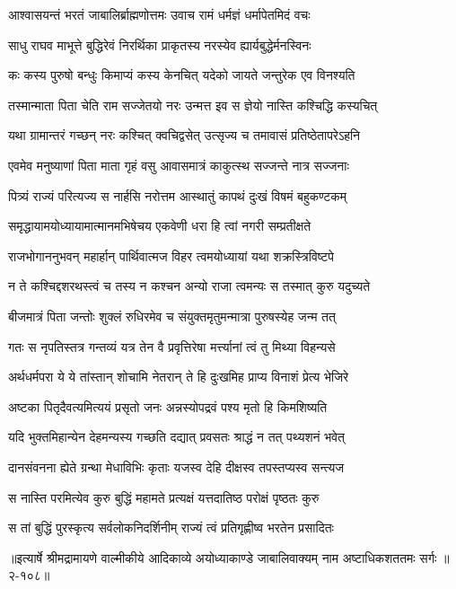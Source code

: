 
\twolineshloka
{आश्वासयन्तं भरतं जाबालिर्ब्राह्मणोत्तमः}
{उवाच रामं धर्मज्ञं धर्मापेतमिदं वचः} %

\twolineshloka
{साधु राघव माभूत्ते बुद्धिरेवं निरर्थिका}
{प्राकृतस्य नरस्येव ह्यार्यबुद्धेर्मनस्विनः} %

\twolineshloka
{कः कस्य पुरुषो बन्धुः किमाप्यं कस्य केनचित्}
{यदेको जायते जन्तुरेक एव विनश्यति} %

\twolineshloka
{तस्मान्माता पिता चेति राम सज्जेतयो नरः}
{उन्मत्त इव स ज्ञेयो नास्ति कश्चिद्धि कस्यचित्} %

\twolineshloka
{यथा ग्रामान्तरं गच्छन् नरः कश्चित् क्वचिद्वसेत्}
{उत्सृज्य च तमावासं प्रतिष्ठेतापरेऽहनि} %

\twolineshloka
{एवमेव मनुष्याणां पिता माता गृहं वसु}
{आवासमात्रं काकुत्स्थ सज्जन्ते नात्र सज्जनाः} %

\twolineshloka
{पित्र्यं राज्यं परित्यज्य स नार्हसि नरोत्तम}
{आस्थातुं कापथं दुःखं विषमं बहुकण्टकम्} %

\twolineshloka
{समृद्धायामयोध्यायामात्मानमभिषेचय}
{एकवेणी धरा हि त्वां नगरी सम्प्रतीक्षते} %

\twolineshloka
{राजभोगाननुभवन् महार्हान् पार्थिवात्मज}
{विहर त्वमयोध्यायां यथा शक्रस्त्रिविष्टपे} %

\twolineshloka
{न ते कश्चिद्दशरथस्त्वं च तस्य न कश्चन}
{अन्यो राजा त्वमन्यः स तस्मात् कुरु यदुच्यते} %

\twolineshloka
{बीजमात्रं पिता जन्तोः शुक्लं रुधिरमेव च}
{संयुक्तमृतुमन्मात्रा पुरुषस्येह जन्म तत्} %

\twolineshloka
{गतः स नृपतिस्तत्र गन्तव्यं यत्र तेन वै}
{प्रवृत्तिरेषा मर्त्त्यानां त्वं तु मिथ्या विहन्यसे} %

\twolineshloka
{अर्थधर्मपरा ये ये तांस्तान् शोचामि नेतरान्}
{ते हि दुःखमिह प्राप्य विनाशं प्रेत्य भेजिरे} %

\twolineshloka
{अष्टका पितृदैवत्यमित्ययं प्रसृतो जनः}
{अन्नस्योपद्रवं पश्य मृतो हि किमशिष्यति} %

\twolineshloka
{यदि भुक्तमिहान्येन देहमन्यस्य गच्छति}
{दद्यात् प्रवसतः श्राद्धं न तत् पथ्यशनं भवेत्} %

\twolineshloka
{दानसंवनना ह्येते ग्रन्था मेधाविभिः कृताः}
{यजस्व देहि दीक्षस्व तपस्तप्यस्व सन्त्यज} %

\twolineshloka
{स नास्ति परमित्येव कुरु बुद्धिं महामते}
{प्रत्यक्षं यत्तदातिष्ठ परोक्षं पृष्ठतः कुरु} %

\twolineshloka
{स तां बुद्धिं पुरस्कृत्य सर्वलोकनिदर्शिनीम्}
{राज्यं त्वं प्रतिगृह्णीष्व भरतेन प्रसादितः} %


॥इत्यार्षे श्रीमद्रामायणे वाल्मीकीये आदिकाव्ये अयोध्याकाण्डे जाबालिवाक्यम् नाम अष्टाधिकशततमः सर्गः ॥२-१०८॥
